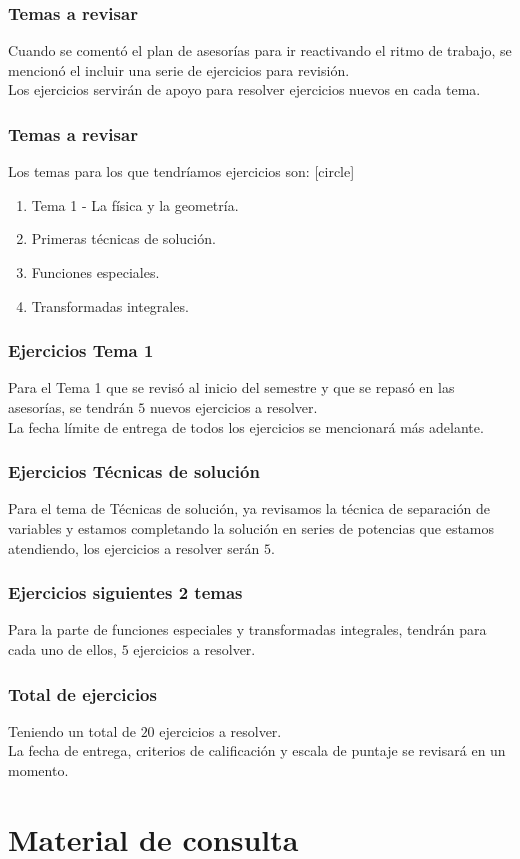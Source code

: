 \documentclass[12pt]{beamer}
\begin{document}
\begin{frame}
\frametitle{Temas a revisar}
Cuando se comentó el plan de asesorías para ir reactivando el ritmo de trabajo, se mencionó el incluir una serie de ejercicios para revisión.
\\
\bigskip
\pause
Los ejercicios servirán de apoyo para resolver ejercicios nuevos en cada tema.
\end{frame}
\begin{frame}
\frametitle{Temas a revisar}
Los temas para los que tendríamos ejercicios son:
\pause
{}
[circle]
\begin{enumerate}[<+->]
\item Tema 1 - La física y la geometría.
\item Primeras técnicas de solución.
\item Funciones especiales.
\item Transformadas integrales.
\end{enumerate}
\end{frame}
\begin{frame}
\frametitle{Ejercicios Tema 1}
Para el Tema 1 que se revisó al inicio del semestre y que se repasó en las asesorías, se tendrán $5$ nuevos ejercicios a resolver.
\\
\bigskip
\pause
La fecha límite de entrega de todos los ejercicios se mencionará más adelante.
\end{frame}
\begin{frame}
\frametitle{Ejercicios Técnicas de solución}
Para el tema de Técnicas de solución, ya revisamos la técnica de separación de variables y estamos completando la solución en series de potencias que estamos atendiendo, los ejercicios a resolver serán $5$.
\end{frame}
\begin{frame}
\frametitle{Ejercicios siguientes 2 temas}
Para la parte de funciones especiales y transformadas integrales, tendrán para cada uno de ellos, $5$ ejercicios a resolver.
\end{frame}
\begin{frame}
\frametitle{Total de ejercicios}
Teniendo un total de $20$ ejercicios a resolver.
\\
\bigskip
\pause
La fecha de entrega, criterios de calificación y escala de puntaje se revisará en un momento.
\end{frame}

\section{Material de consulta}
\end{document}
